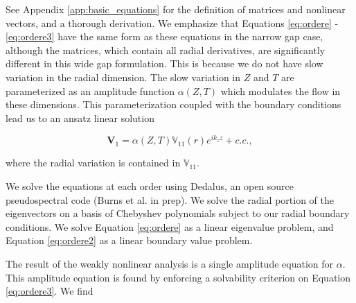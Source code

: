 \documentclass{emulateapj}
\newcommand{\beq}{\begin{equation}}
\newcommand{\eeq}{\end{equation}}
\newcommand\reym{\mathrm{Rm}}
\begin{document}
See Appendix \ref{app:basic_equations} for the definition of matrices and nonlinear vectors, and a thorough derivation. We emphasize that Equations \ref{eq:ordere} - \ref{eq:ordere3} have the same form as these equations in the narrow gap case, although the matrices, which contain all radial derivatives, are significantly different in this wide gap formulation. This is because we do not have slow variation in the radial dimension. The slow variation in $Z$ and $T$ are parameterized as an amplitude function $\alpha(Z, T)$ which modulates the flow in these dimensions. This parameterization coupled with the boundary conditions lead us to an ansatz linear solution 

\beq
\label{eq:ansatz}
\mathbf{V}_1 = \alpha(Z, T) \mathbb{V}_{11}(r) e^{i k_z z} + c.c.,
\eeq

where the radial variation is contained in $\mathbb{V}_{11}$. 

We solve the equations at each order using Dedalus, an open source pseudospectral code (Burns et al. in prep). We solve the radial portion of the eigenvectors on a basis of Chebyshev polynomials subject to our radial boundary conditions. %
We solve Equation \ref{eq:ordere} as a linear eigenvalue problem, and Equation \ref{eq:ordere2} as a linear boundary value problem. %


The result of the weakly nonlinear analysis is a single amplitude equation for $\alpha$. This amplitude equation is found by enforcing a solvability criterion on Equation \ref{eq:ordere3}. We find
\end{document}
